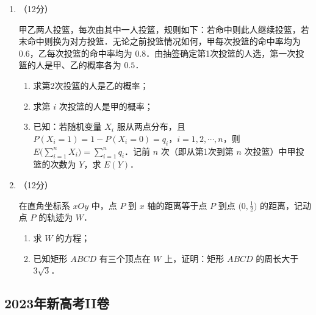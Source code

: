 \begin{description}
\begin{enumerate}[leftmargin=5pt]
        \begin{enumerate}[label=(\arabic*)]
            \item 若 $3a_2=3a_1+a_3$，$S_3+T_3=21$，求 $\{a_n\}$ 的通项公式；
            \item 若 $\{b_n\}$ 为等差数列，且 $S_{99}-T_{99}=99$，求 $d$．
        \end{enumerate}

        \item （12分）

        甲乙两人投篮，每次由其中一人投篮，规则如下：若命中则此人继续投篮，若末命中则换为对方投篮．无论之前投篮情况如何，甲每次投篮的命中率均为 $0.6$，乙每次投篮的命中率均为 $0.8$．由抽签确定第1次投篮的人选，第一次投篮的人是甲、乙的概率各为 $0.5$．

        \begin{enumerate}[label=(\arabic*)]
            \item 求第2次投篮的人是乙的概率；
            \item 求第 $i$ 次投篮的人是甲的概率；
            \item 已知：若随机变量 $X_i$ 服从两点分布，且 $P(X_i=1)=1-P(X_i=0)=q_i$，$i=1,2,\cdots,n$，则 $E\bigl(\sum_{i=1}^n X_i\bigr)=\sum_{i=1}^n q_i$．记前 $n$ 次（即从第1次到第 $n$ 次投篮）中甲投篮的次数为 $Y$，求 $E(Y)$．
        \end{enumerate}

        \item （12分）

        在直角坐标系 $xOy$ 中，点 $P$ 到 $x$ 轴的距离等于点 $P$ 到点 $\bigl(0,\frac{1}{2}\bigr)$ 的距离，记动点 $P$ 的轨迹为 $W$．

        \begin{enumerate}[label=(\arabic*)]
            \item 求 $W$ 的方程；
            \item 已知矩形 $ABCD$ 有三个顶点在 $W$ 上，证明：矩形 $ABCD$ 的周长大于 $3\sqrt{3}$．
        \end{enumerate}
    \end{enumerate}
\end{description}
\clearpage


\subsection{2023年新高考II卷}\label{gk:2023年新高考II卷}

